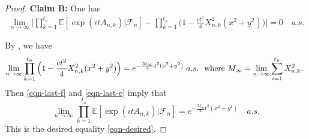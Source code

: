 \documentclass[12pt]{amsart}
\theoremstyle{definition}
\theoremstyle{remark}
\numberwithin{equation}{section}
\begin{document}
\begin{proof}
{\flushleft \bf Claim B: } One has 
\begin{align}\label{eqn-last-f}
\lim_{n\rightarrow\infty }\Big|\prod_{k=1}^{t_n}\mathbb{E}[\exp(itA_{n,k})|\mathcal{F}_n]-\prod_{k=1}^{t_n}\Big(1-\frac{c t^2}{4} X_{n,k}^2 (x^2+y^2)\Big)\Big|=0 \quad a.s.
\end{align}
 
 By \cite[Exercise 3.1.1]{Rick-Durrett},
we have 
\begin{align}\label{eqn-last-e}
\lim_{n\rightarrow\infty}\prod_{k=1}^{t_n}\Big(1-\frac{c t^2}{4} X_{n,k}^2(x^2+y^2)\Big)=e^{-\frac{M_\infty}{4}t^2(x^2+y^2)}\,\,a.s.\,\,\text{
where 
$
M_\infty=\lim_{n\rightarrow\infty}\sum_{i=1}^{t_n} X_{n,k}^2.
$
}
\end{align}
Then \eqref{eqn-last-f} and \eqref{eqn-last-e} imply that 
\[
\lim_{n\rightarrow\infty }\prod_{k=1}^{t_n}\mathbb{E}[\exp(itA_{n,k})|\mathcal{F}_n]=e^{-\frac{M_\infty}{4}t^2(x^2+y^2)}\quad a.s.
\]
This is the desired equality \eqref{eqn-desired}.


\end{proof}
\end{document}
